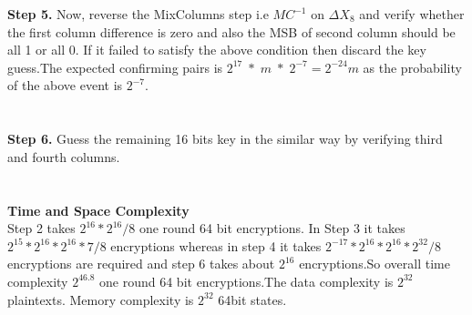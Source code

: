 \begin{frame}
    \textbf{Step 5.} Now, reverse the MixColumns step i.e $MC^{-1}$ on $\Delta X_{8}$ and verify whether the first column difference is zero and also the MSB of second column should be all 1 or all 0. If it failed to satisfy the above condition then discard the key guess.The expected confirming pairs is $2^{17}\;*\;m\;*\;2^{-7} = 2^{-24}m$ as the probability of the above event is $2^{-7}$.\\ \\ \\
\textbf{Step 6.} Guess the remaining 16 bits key in the similar way by verifying third and fourth columns.\\ \\ \\
\textbf{Time and Space Complexity} \\
Step 2 takes $2^{16}*2^{16}/8$ one round 64 bit encryptions. In Step 3 it takes $2^{15}*2^{16}*2^{16}*7/8$ encryptions whereas in step 4 it takes $2^{-17}*2^{16}*2^{16}*2^{32}/8$ encryptions are required and step 6 takes about $2^{16}$ encryptions.So overall time complexity $2^{46.8}$ one round 64 bit encryptions.The data complexity is $2^{32}$ plaintexts. Memory complexity is $2^{32}$ 64bit states. 
\end{frame}

